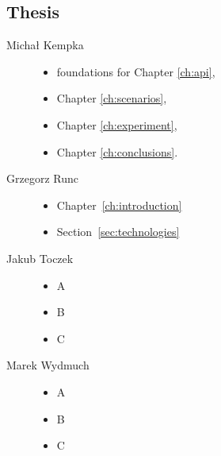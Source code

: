 	\subsection{Thesis}
	\begin{description}
		\item[Michał Kempka] \hfill
			\begin{itemize}
				\item foundations for Chapter \ref{ch:api},
				\item Chapter \ref{ch:scenarios},
				\item Chapter \ref{ch:experiment},
				\item Chapter \ref{ch:conclusions}.
			\end{itemize}
		\item[Grzegorz Runc] \hfill
			\begin{itemize}
				\item Chapter~\ref{ch:introduction}
				\item Section~\ref{sec:technologies}
			\end{itemize}
		\item[Jakub Toczek] \hfill
			\begin{itemize}
				\item A
				\item B
				\item C
			\end{itemize}
		\item[Marek Wydmuch] \hfill
			\begin{itemize}
				\item A
				\item B
				\item C
			\end{itemize}
	\end{description}
